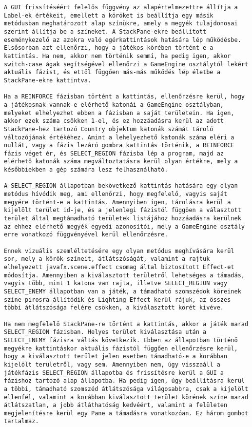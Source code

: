 \begin{verbatim}
A GUI frissítéséért felelős függvény az alapértelmezettre állítja a Label-ek értékeit, emellett a köröket is beállítja egy másik metódusban meghatározott alap színükre, amely a megyék tulajdonosai szerint állítja be a színeket. A StackPane-ekre beállított eseménykezelő az azokra való egérkattintások hatására lép működésbe. Elsősorban azt ellenőrzi, hogy a játékos körében történt-e a kattintás. Ha nem, akkor nem történik semmi, ha pedig igen, akkor switch-case ágak segítségével ellenőrzi a GameEngine osztálytól lekért aktuális fázist, és ettől függően más-más működés lép életbe a StackPane-ekre kattintva. 

Ha a REINFORCE fázisban történt a kattintás, ellenőrzésre kerül, hogy a játékosnak vannak-e elérhető katonái a GameEngine osztályban, melyeket elhelyezhet ebben a fázisban a saját területein. Ha igen, akkor ezek száma csökken 1-el, és ez hozzáadásra kerül az adott StackPane-hez tartozó Country objektum katonák számát tároló változójának értékéhez. Amint a lehelyezhető katonák száma eléri a nullát, vagy a fázis lezáró gombra kattintás történik, a REINFORCE fázis véget ér, és SELECT_REGION fázisba lép a program, majd az elérhető katonák száma megváltoztatásra kerül olyan értékre, mely a későbbiekben a gép számára lesz felhasználható. 

A SELECT_REGION állapotban bekövetkező kattintás hatására egy olyan metódus hívódik meg, ami ellenőrzi, hogy megfelelő, vagyis saját megyére történt-e a kattintás. Amennyiben igen, tárolásra kerül a kijelölt terület id-je, és a jelenlegi fázistól függően a választott terület által megtámadható területek listájához hozzáadásra kerülnek az ehhez elérhető megyék egyedi azonosítói, mely a GameEngine osztály erre vonatkozó függvényével kerül ellenőrzésre. 

Ennek vizuális szemléltetésére egy olyan metódus meghívására kerül sor, mely a körök színeit, átlátszóságát, valamint a rajtuk elhelyezett javafx.scene.effect csomag által biztosított Effect-et módosítja. Amennyiben a kiválasztott területről lehetséges a támadás, vagyis több, mint 1 katona van rajta, illetve SELECT_REGION vagy SELECT_ENEMY állapotban van a játék, a támadható szomszédok köreinek színe pirosra állítódik és Lighting Effect kerül rájuk, az összes többi átlátszósága felére csökken, a kiválasztott körét kivéve. 

Ha nem megfelelő StackPane-re történt a kattintás, akkor a játék marad SELECT_REGION fázisban. Helyes terület kiválasztása után a SELECT_ENEMY fázisra váltás következik. Ebben az állapotban történő megyékre kattintáskor aktuális fázistól függően ellenőrzésre kerül, hogy a kiválasztott terület jelen esetben támadható-e a korábban kijelölt területről, vagy sem. Amennyiben nem, úgy visszaáll a játékfázis SELECT_REGION állapotba és frissítésre kerül a GUI a fázishoz tartozó alap állapotba. Ha pedig igen, úgy beállításra kerül a többi, támadható szomszéd átlátszósága világosabbra, csak a kijelölt ellenfél, valamint a korábban kiválasztott terület körének színe marad átlátszatlan, a jobb átláthatóság kedvéért, valamint a felületen megjelenítésre kerül egy Pane a támadásra vonatkozóan. Ez három gombot tartalmaz. 


\end{verbatim}
